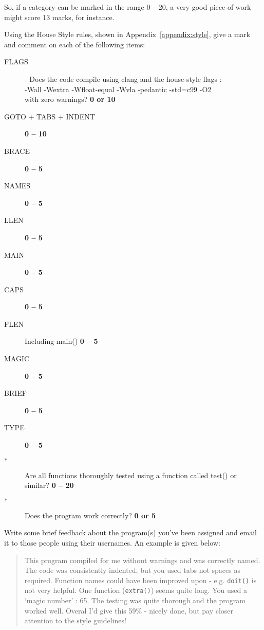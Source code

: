 \noindent So, if a category can be marked in the range 0 – 20, a very good piece of work might score 13 marks, for instance.

Using the House Style rules, shown in Appendix~\ref{appendix:style}, give a mark and comment on each of the following items:
\begin{description}
\item[FLAGS] - Does the code compile using clang and the house-style flags :\\ 
-Wall  -Wextra  -Wfloat-equal -Wvla  -pedantic  -std=c99  -O2\\
with zero warnings?
\hfill{\bf{0 or 10}}

\item[GOTO + TABS + INDENT]
\hfill{\bf{0 – 10}}

\item[BRACE]
\hfill{\bf{0 – 5}}

\item[NAMES]
\hfill{\bf{0 – 5}}

\item[LLEN]
\hfill{\bf{0 – 5}}

\item[MAIN]
\hfill{\bf{0 – 5}}

\item[CAPS]
\hfill{\bf{0 – 5}}

\item[FLEN]
Including main()
\hfill{\bf{0 – 5}}

\item[MAGIC]
\hfill{\bf{0 – 5}}

\item[BRIEF]
\hfill{\bf{0 – 5}}

\item[TYPE]
\hfill{\bf{0 – 5}}

\item[$*$] Are all functions thoroughly tested using a function called test() or similar?
\hfill{\bf{0 – 20}}

\item[$*$] Does the program work correctly?
\hfill{\bf{0 or  5}}

\end{description}

\noindent Write some brief feedback about the program(s) you've been
assigned and email it to those people using their usernames.  An example
is given below:

\begin{quote}
This program compiled for me without warnings and was
correctly named.  The code was consistently indented, but you used tabs
not spaces as required.  Function names could have been improved upon -
e.g. \verb^doit()^ is not very helpful. One function (\verb^extra()^)
seems quite long. You used a `magic number' : 65. The testing was quite
thorough and the program worked well.  Overal I'd give this 59\% - nicely
done, but pay closer attention to the style guidelines!
\end{quote}

